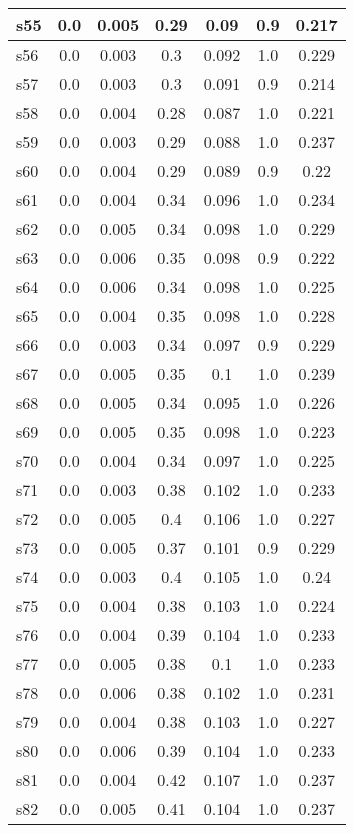 \documentclass{article}
\begin{document}
\begin{tabular}{|l|c|c|c|c|c|c|}
\hline
s55 &0.0 & 0.005 & 0.29 & 0.09 & 0.9 & 0.217\\
\hline
s56 &0.0 & 0.003 & 0.3 & 0.092 & 1.0 & 0.229\\
\hline
s57 &0.0 & 0.003 & 0.3 & 0.091 & 0.9 & 0.214\\
\hline
s58 &0.0 & 0.004 & 0.28 & 0.087 & 1.0 & 0.221\\
\hline
s59 &0.0 & 0.003 & 0.29 & 0.088 & 1.0 & 0.237\\
\hline
s60 &0.0 & 0.004 & 0.29 & 0.089 & 0.9 & 0.22\\
\hline
s61 &0.0 & 0.004 & 0.34 & 0.096 & 1.0 & 0.234\\
\hline
s62 &0.0 & 0.005 & 0.34 & 0.098 & 1.0 & 0.229\\
\hline
s63 &0.0 & 0.006 & 0.35 & 0.098 & 0.9 & 0.222\\
\hline
s64 &0.0 & 0.006 & 0.34 & 0.098 & 1.0 & 0.225\\
\hline
s65 &0.0 & 0.004 & 0.35 & 0.098 & 1.0 & 0.228\\
\hline
s66 &0.0 & 0.003 & 0.34 & 0.097 & 0.9 & 0.229\\
\hline
s67 &0.0 & 0.005 & 0.35 & 0.1 & 1.0 & 0.239\\
\hline
s68 &0.0 & 0.005 & 0.34 & 0.095 & 1.0 & 0.226\\
\hline
s69 &0.0 & 0.005 & 0.35 & 0.098 & 1.0 & 0.223\\
\hline
s70 &0.0 & 0.004 & 0.34 & 0.097 & 1.0 & 0.225\\
\hline
s71 &0.0 & 0.003 & 0.38 & 0.102 & 1.0 & 0.233\\
\hline
s72 &0.0 & 0.005 & 0.4 & 0.106 & 1.0 & 0.227\\
\hline
s73 &0.0 & 0.005 & 0.37 & 0.101 & 0.9 & 0.229\\
\hline
s74 &0.0 & 0.003 & 0.4 & 0.105 & 1.0 & 0.24\\
\hline
s75 &0.0 & 0.004 & 0.38 & 0.103 & 1.0 & 0.224\\
\hline
s76 &0.0 & 0.004 & 0.39 & 0.104 & 1.0 & 0.233\\
\hline
s77 &0.0 & 0.005 & 0.38 & 0.1 & 1.0 & 0.233\\
\hline
s78 &0.0 & 0.006 & 0.38 & 0.102 & 1.0 & 0.231\\
\hline
s79 &0.0 & 0.004 & 0.38 & 0.103 & 1.0 & 0.227\\
\hline
s80 &0.0 & 0.006 & 0.39 & 0.104 & 1.0 & 0.233\\
\hline
s81 &0.0 & 0.004 & 0.42 & 0.107 & 1.0 & 0.237\\
\hline
s82 &0.0 & 0.005 & 0.41 & 0.104 & 1.0 & 0.237\\

\end{tabular}
\end{document}
